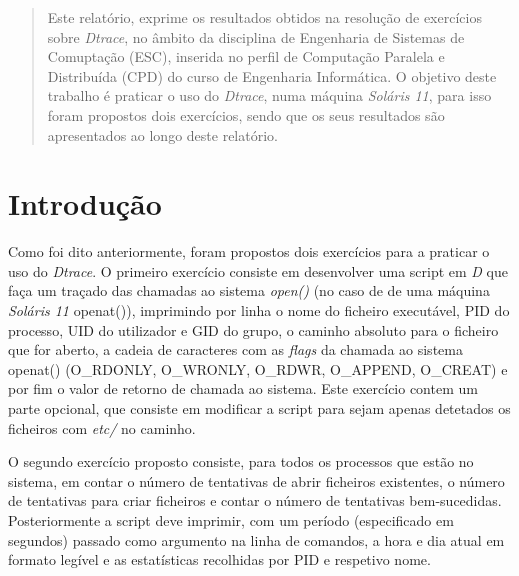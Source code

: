 \documentclass[conference,compsoc]{IEEEtran}
\begin{document}
\maketitle

\begin{abstract}
Este relatório, exprime os resultados obtidos na resolução de exercícios sobre \textit{Dtrace}, no âmbito da disciplina de Engenharia de Sistemas de Comuptação (ESC), inserida no perfil de Computação Paralela e Distribuída (CPD) do curso de Engenharia Informática. O objetivo deste trabalho é praticar o uso do \textit{Dtrace}, numa máquina \textit{Soláris 11}, para isso foram propostos dois exercícios, sendo que os seus resultados são apresentados ao longo deste relatório. 
\end{abstract}





%
\IEEEpeerreviewmaketitle



\section{Introdução}
Como foi dito anteriormente, foram propostos dois exercícios para a praticar o uso do \textit{Dtrace}. O primeiro exercício consiste em desenvolver uma script em \textit{D} que faça um traçado das chamadas ao sistema \textit{open()} (no caso de de uma máquina \textit{Soláris 11} openat()), imprimindo por linha o nome do ficheiro executável, PID do processo, UID do utilizador e GID do grupo, o caminho absoluto para o ficheiro que for aberto, a cadeia de caracteres com as \textit{flags} da chamada ao sistema openat() (O\_RDONLY, O\_WRONLY, O\_RDWR, O\_APPEND, O\_CREAT) e por fim o valor de retorno de chamada ao sistema. Este exercício contem um parte opcional, que consiste em modificar a script para sejam apenas detetados os ficheiros com \textit{etc/} no caminho.

O segundo exercício proposto consiste, para todos os processos que estão no sistema, em contar o número de tentativas de abrir ficheiros existentes, o número de tentativas para criar ficheiros e contar o número de tentativas bem-sucedidas. Posteriormente a script deve imprimir, com um período (especificado em segundos) passado como argumento na linha de comandos, a hora e dia atual em formato legível e as estatísticas recolhidas por PID e respetivo nome. 
\end{document}
